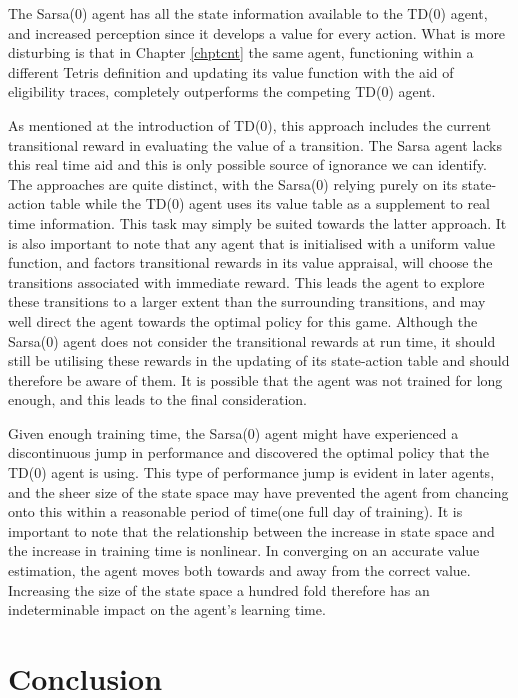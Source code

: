 \documentclass{rucsthesis}
\begin{document}
The Sarsa(0) agent has all the state information available to the TD(0) agent, and increased perception since it develops a value for every action. What is more disturbing is that  in Chapter \ref{chptcnt} the same agent, functioning within a different Tetris definition and updating its value function with the aid of eligibility traces, completely outperforms the competing TD(0) agent. 

As mentioned at the introduction of TD(0), this approach includes the current transitional reward in evaluating the value of a transition. The Sarsa agent lacks this real time aid and this is only possible source of ignorance we can identify. The approaches are quite distinct, with the Sarsa(0) relying purely on its state-action table while the TD(0) agent uses its value table as a supplement to real time information. This task may simply be suited towards the latter approach. It is also important to note that any agent that is initialised with a uniform value function, and factors transitional rewards in its value appraisal, will choose the transitions associated with immediate reward. This leads the agent to explore these transitions to a larger extent than the surrounding transitions, and may well direct the agent towards the optimal policy for this game. Although the Sarsa(0) agent does not consider the transitional rewards at run time, it should still be utilising these rewards in the updating of its state-action table and should therefore be aware of them. It is possible that the agent was not trained for long enough, and this leads to the final consideration.

Given enough training time, the Sarsa(0) agent might have experienced a discontinuous jump in performance and discovered the optimal policy that the TD(0) agent is using. This type of performance jump is evident in later agents, and the sheer size of the state space may have prevented the agent from chancing onto this within a reasonable period of time(one full day of training). It is important to note that the relationship between the increase in state space and the increase in training time is nonlinear. In converging on an accurate value estimation, the agent moves both towards and away from the correct value. Increasing the size of the state space a hundred fold therefore has an indeterminable impact on the agent's learning time.

\section{Conclusion}
\end{document}
